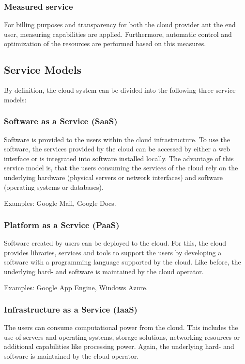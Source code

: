\subsubsection{Measured service}
For billing purposes and transparency for both the cloud provider ant the end user, measuring capabilities are applied. Furthermore, automatic control and optimization of the resources are performed based on this measures.

\subsection{Service Models}
By definition, the cloud system can be divided into the following three service models\cite{nist}:

\subsubsection{Software as a Service (SaaS)}
Software is provided to the users within the cloud infrastructure. To use the software, the services provided by the cloud can be accessed by either a web interface or is integrated into software installed locally. The advantage of this service model is, that the users consuming the services of the cloud rely on the underlying hardware (physical servers or network interfaces) and software (operating systems or databases)\cite{nist}.
		
Examples: Google Mail, Google Docs\cite{trustedcloudcomputing}.

\subsubsection{Platform as a Service (PaaS)}
Software created by users can be deployed to the cloud. For this, the cloud provides libraries, services and tools to support the users by developing a software with a programming language supported by the cloud. Like before, the underlying hard- and software is maintained by the cloud operator\cite{nist}.
	
Examples: Google App Engine, Windows Azure\cite{trustedcloudcomputing}. 

\subsubsection{Infrastructure as a Service (IaaS)}
The users can consume computational power from the cloud. This includes the use of servers and operating systems, storage solutions, networking resources or additional capabilities like processing power. Again, the underlying hard- and software is maintained by the cloud operator\cite{nist}.
	
